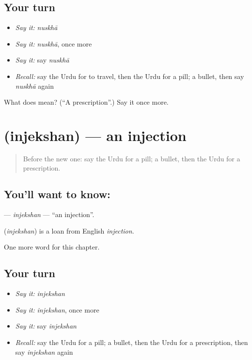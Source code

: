 \subsection*{Your turn}
\begin{itemize}
\raggedright
  \item \emph{Say it:} \emph{nuskhā}
  \item \emph{Say it:} \emph{nuskhā}, once more
  \item \emph{Say it:} say \emph{nuskhā}
  \item \emph{Recall:} say the Urdu for to travel, then the Urdu for a pill; a bullet, then say \emph{nuskhā} again
\end{itemize}

\begin{tcolorbox}[breakable,colback=teal!4,colframe=teal!35!black,title={Before you move on}]
What does  mean? (\textquotedblleft{}A prescription\textquotedblright{}.) Say it once more.
\end{tcolorbox}
\section[\texorpdfstring{\ur{انجکشن} (injekshan)}{انجکشن (injekshan)}]{ (injekshan) — an injection}

\label{lesson:UR-C185-injekshan}



\begin{quote}
Before the new one: say the Urdu for a pill; a bullet, then the Urdu for a prescription.
\end{quote}

\subsection*{You'll want to know: }
\textbf{} — \emph{injekshan} — \textquotedblleft{}an injection\textquotedblright{}.

\begin{cousinweb}
\textbf{} (\emph{injekshan}) is a loan from English \emph{injection}.
\end{cousinweb}

\begin{grammarlens}[title={What you've built}]
One more word for this chapter.
\end{grammarlens}

\subsection*{Your turn}
\begin{itemize}
\raggedright
  \item \emph{Say it:} \emph{injekshan}
  \item \emph{Say it:} \emph{injekshan}, once more
  \item \emph{Say it:} say \emph{injekshan}
  \item \emph{Recall:} say the Urdu for a pill; a bullet, then the Urdu for a prescription, then say \emph{injekshan} again
\end{itemize}

